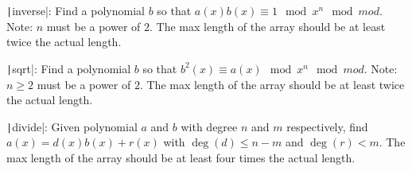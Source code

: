 \begin{compactenum}
\item \texttt|inverse|: Find a polynomial $b$ so that $a(x)b(x)\equiv 1\mod x^n\mod mod$.
Note: $n$ must be a power of $2$. The max length of the array should be at least twice the actual length. 
\item \texttt|sqrt|: Find a polynomial $b$ so that $b^2(x)\equiv a(x)\mod x^n\mod mod$. 
Note: $n\ge 2$ must be a power of $2$. The max length of the array should be at least twice the actual length. 
\item \texttt|divide|: Given polynomial $a$ and $b$ with degree $n$ and $m$ respectively, find $a(x)=d(x)b(x)+r(x)$ with $\operatorname{deg}(d)\le n-m$ and $\operatorname{deg}(r)<m$. The max length of the array should be at least four times the actual length. 
\end{compactenum}

\inputminted{cpp}{src/mathematics/sequence-manipulation/polynomial-operation.cpp.com}

